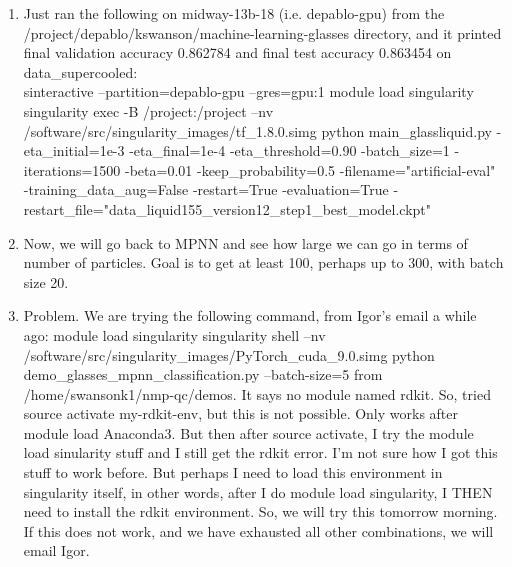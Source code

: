 \documentclass[12pt,reqno]{amsart}
\numberwithin{equation}{section}
\begin{document}
\begin{enumerate}
\item Just ran the following on midway-13b-18 (i.e. depablo-gpu) from the /project/depablo/kswanson/machine-learning-glasses directory, and it printed final validation accuracy 0.862784 and final test accuracy 0.863454 on data\_supercooled: \\
sinteractive --partition=depablo-gpu --gres=gpu:1
module load singularity
singularity exec -B /project:/project --nv /software/src/singularity\_images/tf\_1.8.0.simg python main\_glassliquid.py -eta\_initial=1e-3 -eta\_final=1e-4 -eta\_threshold=0.90 -batch\_size=1 -iterations=1500 -beta=0.01 -keep\_probability=0.5 -filename="artificial-eval" -training\_data\_aug=False -restart=True -evaluation=True -restart\_file="data\_liquid155\_version12\_step1\_best\_model.ckpt" 
\item Now, we will go back to MPNN and see how large we can go in terms of number of particles.  Goal is to get at least 100, perhaps up to 300, with batch size 20.  
\item Problem.  We are trying the following command, from Igor's email a while ago:
module load singularity
singularity shell --nv /software/src/singularity\_images/PyTorch\_cuda\_9.0.simg python demo\_glasses\_mpnn\_classification.py --batch-size=5 from /home/swansonk1/nmp-qc/demos.  It says no module named rdkit.  So, tried source activate my-rdkit-env, but this is not possible.  Only works after module load Anaconda3.  But then after source activate, I try the module load sinularity stuff and I still get the rdkit error.  I'm not sure how I got this stuff to work before.  But perhaps I need to load this environment in singularity itself, in other words, after I do module load singularity, I THEN need to install the rdkit environment.  So, we will try this tomorrow morning.  If this does not work, and we have exhausted all other combinations, we will email Igor.  
\end{enumerate}
\end{document}
